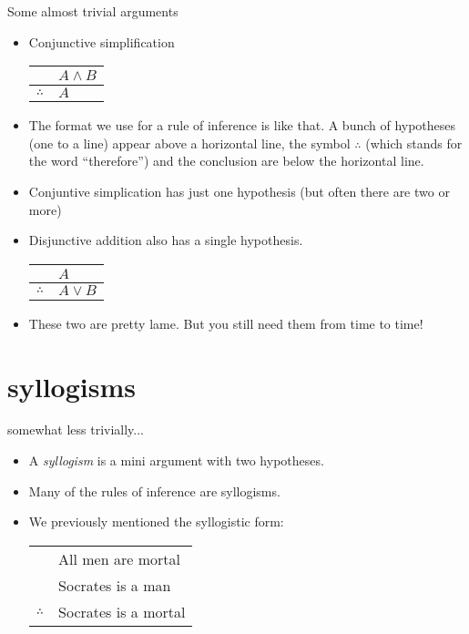 \documentclass[landscape]{beamer}
\begin{document}
\begin{frame}{Some almost trivial arguments}
\begin{itemize}
\item Conjunctive simplification \pause 
\newline 

\begin{center}
\begin{tabular}{cl}
 & $A \land B$ \\ \hline
$\therefore$ & $A$ \\
\end{tabular}
\end{center}
\pause 

\item The format we use for a rule of inference is like that. A bunch of hypotheses (one to a line) appear above a horizontal line, the symbol $\therefore$ (which stands for the word ``therefore'') and the conclusion are below the horizontal line. \pause
\item Conjuntive simplication has just one hypothesis (but often there are two or more) \pause
\item Disjunctive addition also has a single hypothesis. \pause \newline

\begin{center}
\begin{tabular}{cl}
 & $A$ \\ \hline
$\therefore$ & $A \lor B$ \\
\end{tabular}
\end{center}
\pause

\item These two are pretty lame. \pause But you still need them from time to time!

\end{itemize}
\end{frame}

\section{syllogisms}

\begin{frame}{somewhat less trivially...}
\begin{itemize}
\item A {\em syllogism} is a mini argument with two hypotheses. \pause
\item Many of the rules of inference are syllogisms. \pause
\item We previously mentioned the syllogistic form:

\begin{center}
\begin{tabular}{cl}
 & All men are mortal \\ 
 & Socrates is a man \\ \hline
$\therefore$ & Socrates is a mortal \\
\end{tabular}
\end{center}

\end{itemize}
\end{frame}
\end{document}
